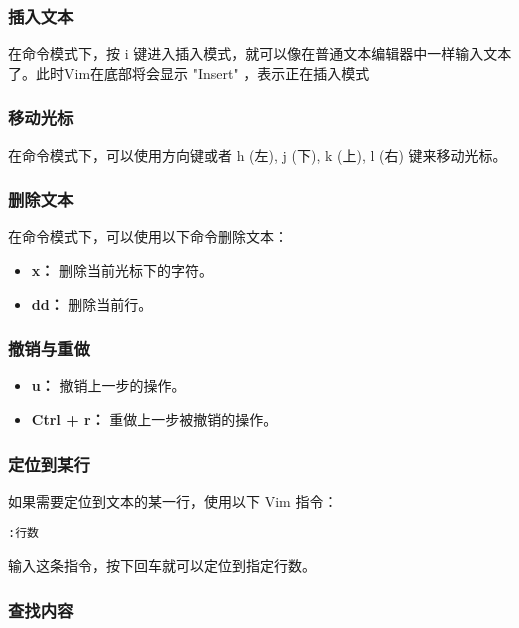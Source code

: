 \documentclass[UTF8]{gyh}
\begin{document}
\subsubsection{插入文本}

在命令模式下，按 i 键进入插入模式，就可以像在普通文本编辑器中一样输入文本了。此时Vim在底部将会显示 "Insert" ，表示正在插入模式

\subsubsection{移动光标}

在命令模式下，可以使用方向键或者 h (左), j (下), k (上), l (右) 键来移动光标。

\subsubsection{删除文本}

在命令模式下，可以使用以下命令删除文本：
\begin{itemize}
\item \textbf{x：} 删除当前光标下的字符。
\item \textbf{dd：} 删除当前行。
\end{itemize}

\subsubsection{撤销与重做}

\begin{itemize}
\item \textbf{u：} 撤销上一步的操作。
\item \textbf{Ctrl + r：} 重做上一步被撤销的操作。
\end{itemize}

\subsubsection{定位到某行}

如果需要定位到文本的某一行，使用以下 Vim 指令：

\begin{lstlisting}
:行数
\end{lstlisting}

输入这条指令，按下回车就可以定位到指定行数。

\subsubsection{查找内容}
\end{document}
